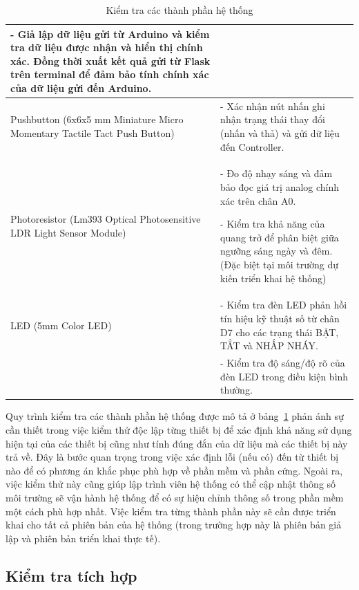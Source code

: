 {\begin{table}[h!]
\begin{tabular}{|p{4cm}|p{10cm}|}
- Giả lập dữ liệu gửi từ Arduino và kiểm tra dữ liệu được nhận và hiển thị chính xác. Đồng thời xuất kết quả gửi từ Flask trên terminal để đảm bảo tính chính xác của dữ liệu gửi đến Arduino. \\ \hline
Pushbutton (6x6x5 mm Miniature Micro Momentary Tactile Tact Push Button) & - Xác nhận nút nhấn ghi nhận trạng thái thay đổi (nhấn và thả) và gửi dữ liệu đến Controller. \\ \hline
Photoresistor (Lm393 Optical Photosensitive LDR Light Sensor Module) & - Đo độ nhạy sáng và đảm bảo đọc giá trị analog chính xác trên chân A0. 


- Kiểm tra khả năng của quang trở để phân biệt giữa ngưỡng sáng ngày và đêm. (Đặc biệt tại môi trường dự kiến triển khai hệ thống) \\ \hline
LED (5mm Color LED) & - Kiểm tra đèn LED phản hồi tín hiệu kỹ thuật số từ chân D7 cho các trạng thái BẬT, TẮT và NHẤP NHÁY. \\
& - Kiểm tra độ sáng/độ rõ của đèn LED trong điều kiện bình thường. \\ \hline
\end{tabular}
\caption{Kiểm tra các thành phần hệ thống}
\label{tab:component_checks}
\end{table}

Quy trình kiểm tra các thành phần hệ thống được mô tả ở bảng~\ref{tab:component_checks} phản ánh sự cần thiết trong việc kiểm thử độc lập từng thiết bị để xác định khả năng sử dụng hiện tại của các thiết bị cũng như tính đúng đắn của dữ liệu mà các thiết bị này trả về. Đây là bước quan trọng trong việc xác định lỗi (nếu có) đến từ thiết bị nào để có phương án khắc phục phù hợp về phần mềm và phần cứng. Ngoài ra, việc kiểm thử này cũng giúp lập trình viên hệ thống có thể cập nhật thông số môi trường sẽ vận hành hệ thống để có sự hiệu chỉnh thông số trong phần mềm một cách phù hợp nhất. Việc kiểm tra từng thành phần này sẽ cần được triển khai cho tất cả phiên bản của hệ thống (trong trường hợp này là phiên bản giả lập và phiên bản triển khai thực tế).   


\pagebreak
\subsection{Kiểm tra tích hợp}

}
